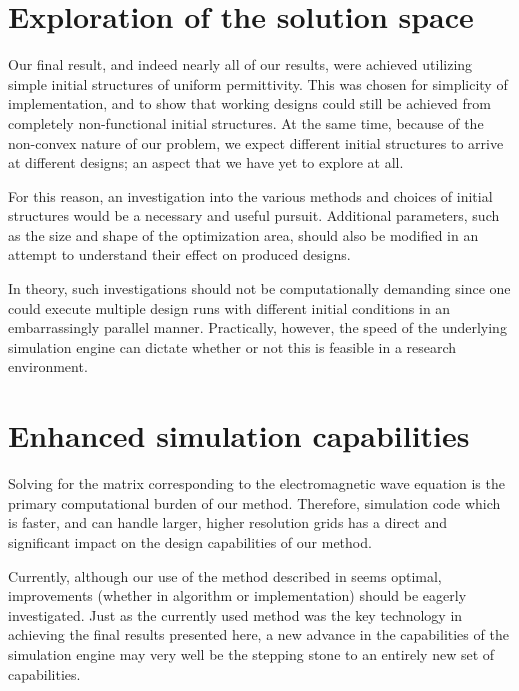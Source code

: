 \section{Exploration of the solution space}
Our final result, and indeed nearly all of our results,
    were achieved utilizing simple initial structures
    of uniform permittivity.
This was chosen for simplicity of implementation,
    and to show that working designs could still be achieved
    from completely non-functional initial structures.
At the same time, because of the non-convex nature of our problem,
    we expect different initial structures to arrive at different designs;
    an aspect that we have yet to explore at all.

For this reason, 
    an investigation into the various methods and choices of initial structures 
    would be a necessary and useful pursuit.
Additional parameters, such as the size and shape of the optimization area,
    should also be modified in an attempt to understand their effect
    on produced designs.

In theory, such investigations should not be computationally demanding
    since one could execute multiple design runs with different initial conditions
    in an embarrassingly parallel manner.
Practically, however, the speed of the underlying simulation engine
    can dictate whether or not this is feasible in a research environment.

\section{Enhanced simulation capabilities}
Solving for the matrix corresponding to the electromagnetic wave equation
    is the primary computational burden of our method.
Therefore, simulation code which is faster, and can handle larger, higher
    resolution grids
    has a direct and significant impact on the design capabilities of our method.

Currently, although our use of the method described in \cite{Shin12} seems optimal,
    improvements (whether in algorithm or implementation)
    should be eagerly investigated.
Just as the currently used method was the key technology in achieving 
    the final results presented here,
    a new advance in the capabilities of the simulation engine
    may very well be the stepping stone
    to an entirely new set of capabilities.


